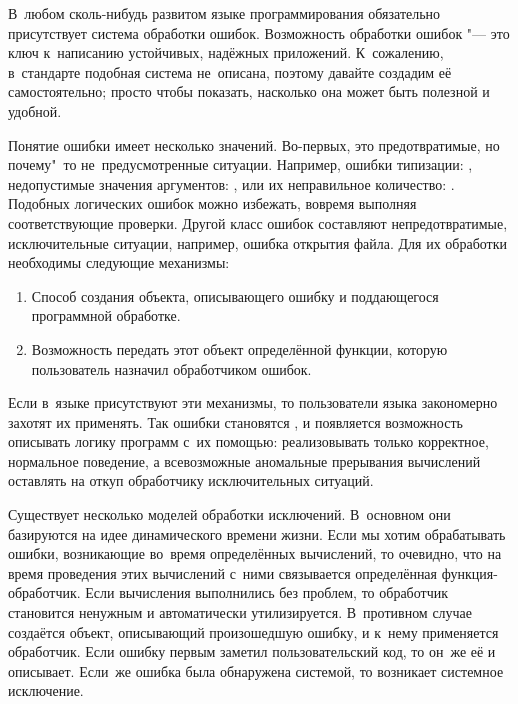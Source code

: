 В~любом сколь-нибудь развитом языке программирования обязательно присутствует
система обработки ошибок. Возможность обработки ошибок "--- это ключ к~написанию
устойчивых, надёжных приложений. К~сожалению, в~стандарте {\RnRS} подобная
система не~описана, поэтому давайте создадим её самостоятельно; просто чтобы
показать, насколько она может быть полезной и удобной.

Понятие ошибки имеет несколько значений. Во-первых, это предотвратимые, но
почему"~то не~предусмотренные ситуации. Например, ошибки типизации:
, недопустимые значения аргументов: , или
их неправильное количество: . Подобных логических ошибок можно
избежать, вовремя выполняя соответствующие проверки. Другой класс ошибок
составляют непредотвратимые, исключительные ситуации, например, ошибка открытия
файла. Для их обработки необходимы следующие механизмы:

\begin{enumerate}
  \item Способ создания объекта, описывающего ошибку и поддающегося
        программной обработке.

  \item Возможность передать этот объект определённой функции,
        которую пользователь назначил обработчиком ошибок.
\end{enumerate}

Если в~языке присутствуют эти механизмы, то пользователи языка закономерно
захотят их применять. Так ошибки становятся , и появляется
возможность описывать логику программ с~их помощью: реализовывать только
корректное, нормальное поведение, а всевозможные аномальные прерывания
вычислений оставлять на откуп обработчику исключительных ситуаций.

Существует несколько моделей обработки исключений. В~основном они базируются на
идее динамического времени жизни. Если мы хотим обрабатывать ошибки, возникающие
во~время определённых вычислений, то очевидно, что на время проведения этих
вычислений с~ними связывается определённая функция-обработчик. Если вычисления
выполнились без проблем, то обработчик становится ненужным и автоматически
утилизируется. В~противном случае создаётся объект, описывающий произошедшую
ошибку, и к~нему применяется обработчик. Если ошибку первым заметил
пользовательский код, то он~же её и описывает. Если~же ошибка была обнаружена
системой, то возникает системное исключение.

